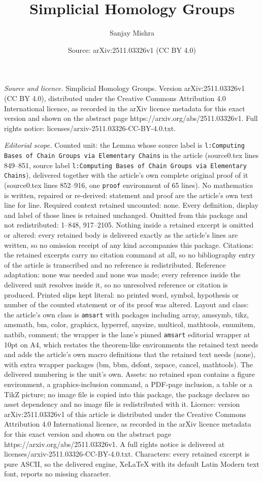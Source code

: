 \documentclass[10pt,a4paper]{amsart}
\title[Simplicial Homology Groups]{Simplicial Homology Groups}
\author{Sanjay Mishra}
\date{Source: arXiv:2511.03326v1 (CC BY 4.0)}
\begin{document}
\maketitle

\noindent\emph{Source and licence.} Simplicial Homology Groups. Version arXiv:2511.03326v1 (CC BY 4.0), distributed under the Creative Commons Attribution 4.0 International licence, as recorded in the arXiv licence metadata for this exact version and shown on the abstract page https://arxiv.org/abs/2511.03326v1. Full rights notice: licenses/arxiv-2511.03326-CC-BY-4.0.txt.\par\smallskip

\noindent\textit{Editorial scope.} Counted unit: the Lemma whose source label is \texttt{l:Computing Bases of Chain Groups via Elementary Chains} in the article (source0.tex lines 849--851, source label \texttt{l:Computing Bases of Chain Groups via Elementary Chains}), delivered together with the article's own complete original proof of it (source0.tex lines 852--916, one \texttt{proof} environment of 65 lines). No mathematics is written, repaired or re-derived: statement and proof are the article's own text line for line. Required context retained uncounted: none. Every definition, display and label of those lines is retained unchanged. Omitted from this package and not redistributed: 1--848, 917--2105. Nothing inside a retained excerpt is omitted or altered: every retained body is delivered exactly as the article's lines are written, so no omission receipt of any kind accompanies this package. Citations: the retained excerpts carry no citation command at all, so no bibliography entry of the article is transcribed and no reference is redistributed. Reference adaptation: none was needed and none was made; every reference inside the delivered unit resolves inside it, so no unresolved reference or citation is produced. Printed slips kept literal: no printed word, symbol, hypothesis or number of the counted statement or of its proof was altered. Layout and class: the article's own class is \texttt{amsart} with packages including array, amssymb, tikz, amsmath, bm, color, graphicx, hyperref, anysize, multicol, mathtools, enumitem, natbib, comment; the wrapper is the lane's pinned \texttt{amsart} editorial wrapper at 10pt on A4, which restates the theorem-like environments the retained text needs and adds the article's own macro definitions that the retained text needs (none), with extra wrapper packages (bm, bbm, dsfont, xspace, cancel, mathtools). The delivered numbering is the unit's own. Assets: no retained span contains a figure environment, a graphics-inclusion command, a PDF-page inclusion, a table or a TikZ picture; no image file is copied into this package, the package declares no asset dependency and no image file is redistributed with it. Licence: version arXiv:2511.03326v1 of this article is distributed under the Creative Commons Attribution 4.0 International licence, as recorded in the arXiv licence metadata for this exact version and shown on the abstract page https://arxiv.org/abs/2511.03326v1. A full rights notice is delivered at licenses/arxiv-2511.03326-CC-BY-4.0.txt. Characters: every retained excerpt is pure ASCII, so the delivered engine, XeLaTeX with its default Latin Modern text font, reports no missing character.
\end{document}
